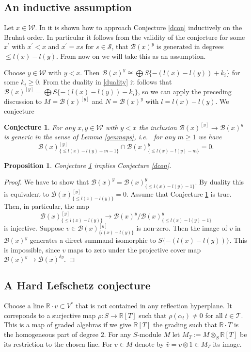 \documentclass[12pt]{amsart}
\newtheorem{proposition}[theorem]{Proposition}
\newtheorem{conjecture}[theorem]{Conjecture}
\theoremstyle{definition}
\theoremstyle{remark}
\def\varle{\leqslant}
\newcommand{\CS}{{\mathcal S}}
\newcommand{\CT}{{\mathcal T}}
\newcommand{\CW}{{\mathcal W}}
\newcommand{\SB}{{\mathscr B}}
\newcommand{\DR}{{\mathbb R}}
\begin{document}
\subsection{An inductive assumption}
Let $x\in\CW$.
In \cite{Fie2} it is shown how to approach Conjecture \ref{dcon} inductively on the Bruhat order. In particular it follows from the validity of the conjecture for  some $x^\prime$ with $x^\prime<x$ and $x^\prime=xs$ for $s\in\CS$, that $\SB(x)^y$ is generated in degrees $\leq l(x)-l(y)$. From now on we will take this as an assumption.

Choose $y\in\CW$ with $y<x$. Then $\SB(x)^y\cong\bigoplus S\{-(l(x)-l(y))+k_i\}$ for some $k_i\geq 0$. From the duality in \ref{duality} it follows that $\SB(x)^{[y]}=\bigoplus S\{-(l(x)-l(y))-k_i\}$, so we can apply the preceding discussion to $M=\SB(x)^{[y]}$ and $N=\SB(x)^y$ with $l=l(x)-l(y)$. We conjecture

\begin{conjecture}\label{pcon} For any $x,y\in\CW$ with $y<x$ the inclusion $\SB(x)^{[y]}\to \SB(x)^y$ is generic in the sense of Lemma \ref{genmaps}, i.e.~ for any $m\geq 1$ we have
$$
\SB(x)^{[y]}_{\{\varle l(x)-l(y)+m-1\}}\cap \SB(x)^y_{\{\varle l(x)-l(y)-m\}}=0.
$$
\end{conjecture}

\begin{proposition} Conjecture \ref{pcon} implies Conjecture \ref{dcon}.
\end{proposition}
\begin{proof} We have to show that $\SB(x)^y=\SB(x)^y_{\{\varle l(x)-l(y)-1\}}$. By duality this is equivalent to $\SB(x)^{[y]}_{\{\varle l(x)-l(y)\}}=0$. Assume that Conjecture \ref{pcon} is true. Then, in particular, the map
$$
\SB(x)^{[y]}_{\{\varle l(x)-l(y)\}}\to\SB(x)^y/\SB(x)^y_{\{\varle l(x)-l(y)-1\}}
$$
is injective. Suppose $v\in \SB(x)^{[y]}_{\{l(x)-l(y)\}}$ is non-zero. Then the image of $v$ in $\SB(x)^y$ generates a direct summand isomorphic to $S\{-(l(x)-l(y))\}$. This is impossible, since $v$ maps to zero under the projective cover map $\SB(x)^y\to \SB(x)^{\delta y}$.
\end{proof}

\subsection{A Hard Lefschetz conjecture}

Choose a line $\DR\cdot v\subset V^\ast$ that is not contained in any reflection hyperplane. It correponds to a surjective map $\rho\colon S\to \DR[T]$ such that $\rho(\alpha_t)\neq 0$ for all $t\in\CT$. This is a map of graded algebras if we give $\DR[T]$ the grading such that $\DR\cdot T$ is the homogeneous part of degree $2$.  For any $S$-module $M$ let $M_T:=M\otimes_S \DR[T]$ be its restriction to the chosen line.  For $v\in M$  denote by $\bar v=v\otimes 1\in M_T$ its image. 
\end{document}
